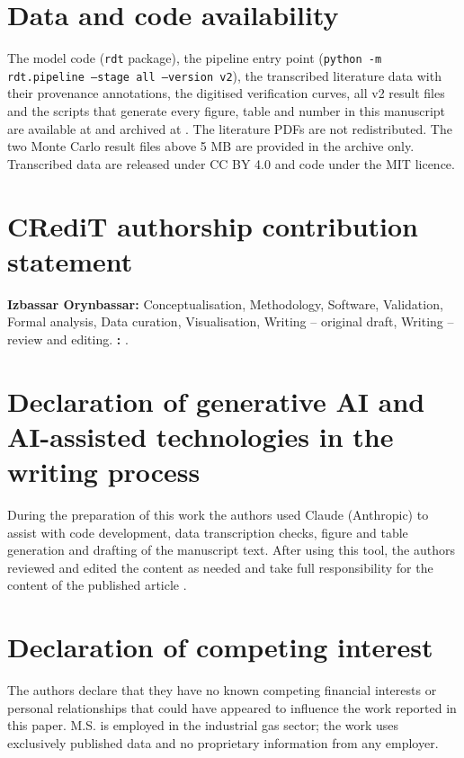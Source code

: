 \section*{Data and code availability}

The model code (\texttt{rdt} package), the pipeline entry point (\texttt{python -m rdt.pipeline --stage all --version v2}), the
transcribed literature data with their provenance annotations, the digitised verification curves, all v2 result files and the
scripts that generate every figure, table and number in this manuscript are available at  and archived at
. The literature PDFs are not redistributed. The two Monte Carlo result files above 5 MB are provided in the
archive only. Transcribed data are released under CC BY 4.0 and code under the MIT licence.

\section*{CRediT authorship contribution statement}

\textbf{Izbassar Orynbassar:} Conceptualisation, Methodology, Software, Validation, Formal analysis, Data curation, Visualisation,
Writing -- original draft, Writing -- review and editing. \textbf{:} .

\section*{Declaration of generative AI and AI-assisted technologies in the writing process}

During the preparation of this work the authors used Claude (Anthropic) to assist with code development, data transcription
checks, figure and table generation and drafting of the manuscript text. After using this tool, the authors reviewed and edited the
content as needed and take full responsibility for the content of the published article .

\section*{Declaration of competing interest}

The authors declare that they have no known competing financial interests or personal relationships that could have appeared to
influence the work reported in this paper. M.S. is employed in the industrial gas sector; the work uses exclusively published
data and no proprietary information from any employer.

